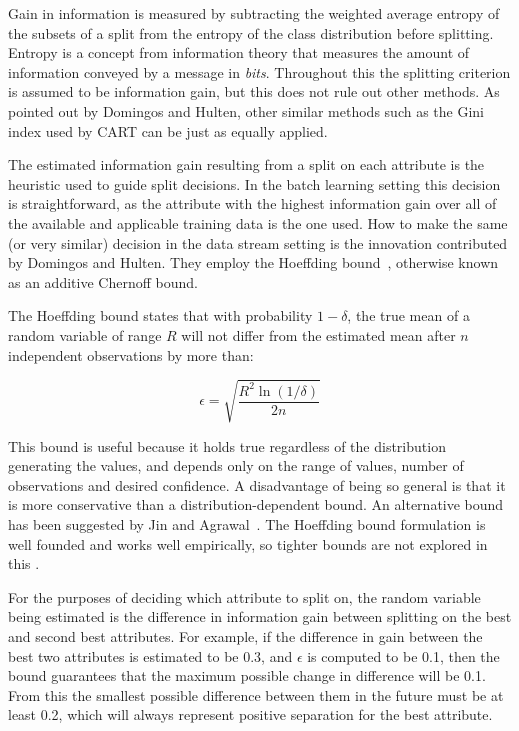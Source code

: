 Gain in information is measured by subtracting the weighted average entropy of the subsets of a split from the entropy of the class distribution before splitting. Entropy is a concept from information theory that measures the amount of information conveyed by a message in {\em bits}. Throughout this \thesis  the splitting criterion is assumed to be information gain, but this does not rule out other methods. As pointed out by Domingos and Hulten, other similar methods such as the Gini index used by CART can be just as equally applied.

The estimated information gain resulting from a split on each attribute is the heuristic used to guide split decisions. In the batch learning setting this decision is straightforward, as the attribute with the highest information gain over all of the available and applicable training data is the one used. How to make the same (or very similar) decision in the data stream setting is the innovation contributed by Domingos and Hulten. They employ the Hoeffding bound~\cite{hoeffding}, otherwise known as an additive Chernoff bound.

The Hoeffding bound states that with probability $1 - \delta$, the true mean of a random variable of range $R$ will not differ from the estimated mean after $n$ independent observations by more than:

\begin{equation} \label{eq:hbound}
\epsilon = \sqrt{\frac{R^{2}\ln(1/\delta)}{2n}}
\end{equation}

This bound is useful because it holds true regardless of the distribution generating the values, and depends only on the range of values, number of observations and desired confidence. A disadvantage of being so general is that it is more conservative than a distribution-dependent bound.
An alternative bound has been suggested by Jin and Agrawal~\cite{nip}.
The Hoeffding bound formulation is well founded and works well empirically, so tighter bounds are not explored in this \thesisc. 

For the purposes of deciding which attribute to split on, the random variable being estimated is the difference in information gain between splitting on the best and second best attributes. For example, if the difference in gain between the best two attributes is estimated to be 0.3, and $\epsilon$ is computed to be 0.1, then the bound guarantees that the maximum possible change in difference will be 0.1. From this the smallest possible difference between them in the future must be at least 0.2, which will always represent positive separation for the best attribute.

